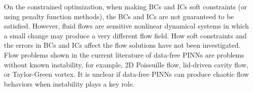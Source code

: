 On the constrained optimization, when making BCs and ICs soft constraints (or using penalty function methods), the BCs and ICs are not guaranteed to be satisfied.
However, fluid flows are sensitive nonlinear dynamical systems in which a small change may produce a very different flow field.
How soft constraints and the errors in BCs and ICs affect the flow solutions have not been investigated.
Flow problems shown in the current literature of data-free PINNs are problems without known instability, for example, 2D Poiseuille flow, lid-driven cavity flow, or Taylor-Green vortex.
It is unclear if data-free PINNs can produce chaotic flow behaviors when instability plays a key role.

